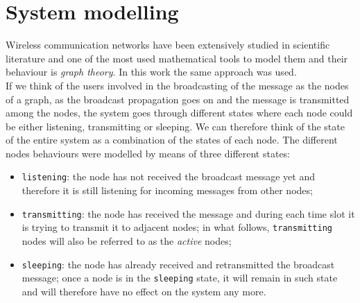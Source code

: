 %
\chapter{System modelling}
\label{modelling}
Wireless communication networks have been extensively studied in scientific
literature and one of the most used mathematical tools to model them and their
behaviour is \textit{graph theory}. In this work the same approach was used.\\
If we think of the users involved in the broadcasting of the message as the
nodes of a graph, as the broadcast propagation goes on and the message is
transmitted among the nodes, the system goes through different states where each
node could be either listening, transmitting or sleeping.
We can therefore think of the state of the entire system as a combination of
the states of each node. The different nodes behaviours were modelled by means
of three different states:
\begin{itemize}
	\item \texttt{listening}: the node has not received the broadcast message
	yet and therefore it is still listening for incoming messages from other nodes;
	\item \texttt{transmitting}: the node has received the message and during
	each time slot it is trying to transmit it to adjacent nodes; in what
	follows, \texttt{transmitting} nodes will also be referred to as the
	\textit{active} nodes;
	\item \texttt{sleeping}: the node has already received and retransmitted
	the broadcast message; once a node is in the \texttt{sleeping} state, it
	will remain in such state and will therefore have no effect on the system
	any more.
\end{itemize}
